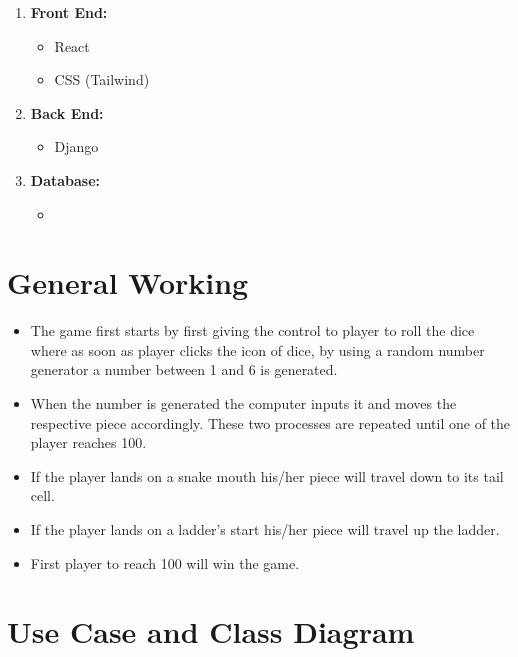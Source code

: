\documentclass{article}
\begin{document}
    \begin{enumerate}
        \item \textbf{Front End: }
            \begin{itemize}
                \item React
                \item CSS (Tailwind)
            \end{itemize}

        \item \textbf{Back End: }
            \begin{itemize}
                \item Django
            \end{itemize}

        \item \textbf{Database: }
            \begin{itemize}
                \item 
            \end{itemize}
    \end{enumerate}

\section{General Working}
    \begin{itemize}
        \item The game first starts by first giving the control to player to roll the dice where as soon as player clicks the icon of dice, by using a random number generator a number between 1 and 6 is generated.
        \item When the number is generated the computer inputs it and moves the respective piece accordingly. These two processes are repeated until one of the player reaches 100.
        \item If the player lands on a snake mouth his/her piece will travel down to its tail cell.
        \item If the player lands on a ladder's start his/her piece will travel up the ladder.
        \item First player to reach 100 will win the game.
    \end{itemize}

\section{Use Case and Class Diagram}
\end{document}
